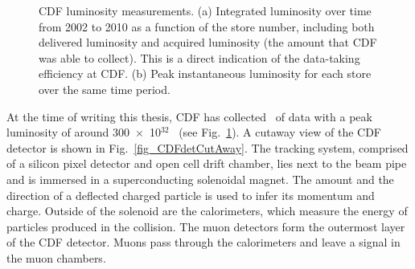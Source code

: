\begin{figure}[p!]
\begin{centering}


\caption{CDF luminosity measurements. (a) Integrated luminosity over time from 2002 to 2010 as a function of the store number, including both delivered luminosity and acquired luminosity (the amount that CDF was able to collect). This is a direct indication of the data-taking efficiency at CDF. (b) Peak instantaneous luminosity for each store over the same time period.}
\label{fig_CDFLumi}
\end{centering}
\end{figure}

At the time of writing this thesis, CDF has collected \cdfTotCurrLum~of data with a peak luminosity of around \mbox{300~$\times$ 10$^{32}$~\instLumUnits} (see Fig.~\ref{fig_CDFLumi}). A cutaway view of the CDF detector is shown in Fig.~\ref{fig_CDFdetCutAway}. The tracking system, comprised of a silicon pixel detector and open cell drift chamber, lies next to the beam pipe and is immersed in a superconducting solenoidal magnet. The amount and the direction of a deflected charged particle is used to infer its momentum and charge. Outside of the solenoid are the calorimeters, which measure the energy of particles produced in the collision. The muon detectors form the outermost layer of the CDF detector. Muons pass through the calorimeters and leave a signal in the muon chambers.

